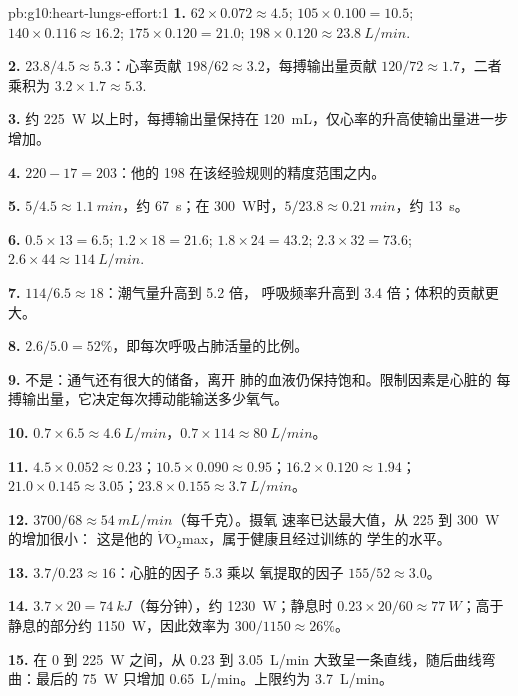 \begin{solution}{pb:g10:heart-lungs-effort:1}
\textbf{1.} $62 \times 0.072 \approx 4.5$; $105 \times 0.100 = 10.5$;
$140 \times 0.116 \approx 16.2$; $175 \times 0.120 = 21.0$;
$198 \times 0.120 \approx \qty{23.8}{L/min}$.

\textbf{2.} $23.8/4.5 \approx 5.3$：心率贡献 $198/62
\approx 3.2$，每搏输出量贡献 $120/72 \approx 1.7$，二者乘积为 $3.2 \times
1.7 \approx 5.3$.

\textbf{3.} 约 \qty{225}{W} 以上时，每搏输出量保持在
\qty{120}{mL}，仅心率的升高使输出量进一步增加。

\textbf{4.} $220 - 17 = 203$：他的 198 在该经验规则的精度范围之内。

\textbf{5.} $5/4.5 \approx \qty{1.1}{min}$，约 \qty{67}{s}；在
\qty{300}{W}时，$5/23.8 \approx \qty{0.21}{min}$，约 \qty{13}{s}。

\textbf{6.} $0.5 \times 13 = 6.5$; $1.2 \times 18 = 21.6$; $1.8 \times
24 = 43.2$; $2.3 \times 32 = 73.6$; $2.6 \times 44 \approx
\qty{114}{L/min}$.

\textbf{7.} $114/6.5 \approx 18$：潮气量升高到 5.2 倍，
呼吸频率升高到 3.4 倍；体积的贡献更大。

\textbf{8.} $2.6/5.0 = 52\%$，即每次呼吸占肺活量的比例。

\textbf{9.} 不是：通气还有很大的储备，离开
肺的血液仍保持饱和。限制因素是心脏的
每搏输出量，它决定每次搏动能输送多少氧气。

\textbf{10.} $0.7 \times 6.5 \approx \qty{4.6}{L/min}$，$0.7 \times
114 \approx \qty{80}{L/min}$。

\textbf{11.} $4.5 \times 0.052 \approx 0.23$；$10.5 \times 0.090
\approx 0.95$；$16.2 \times 0.120 \approx 1.94$；$21.0 \times 0.145
\approx 3.05$；$23.8 \times 0.155 \approx \qty{3.7}{L/min}$。

\textbf{12.} $3700/68 \approx \qty{54}{mL/min}$（每千克）。摄氧
速率已达最大值，从 225 到 \qty{300}{W} 的增加很小：
这是他的 $\dot V\!\mathrm{O_2}$max，属于健康且经过训练的
学生的水平。

\textbf{13.} $3.7/0.23 \approx 16$：心脏的因子 5.3 乘以
氧提取的因子 $155/52 \approx 3.0$。

\textbf{14.} $3.7 \times 20 = \qty{74}{kJ}$（每分钟），约
\qty{1230}{W}；静息时 $0.23 \times 20/60 \approx \qty{77}{W}$；高于
静息的部分约 \qty{1150}{W}，因此效率为 $300/1150 \approx
26\%$。

\textbf{15.} 在 0 到 \qty{225}{W} 之间，从 \num{0.23} 到
\qty{3.05}{L/min} 大致呈一条直线，随后曲线弯曲：最后的
\qty{75}{W} 只增加 \qty{0.65}{L/min}。上限约为
\qty{3.7}{L/min}。


\end{solution}
